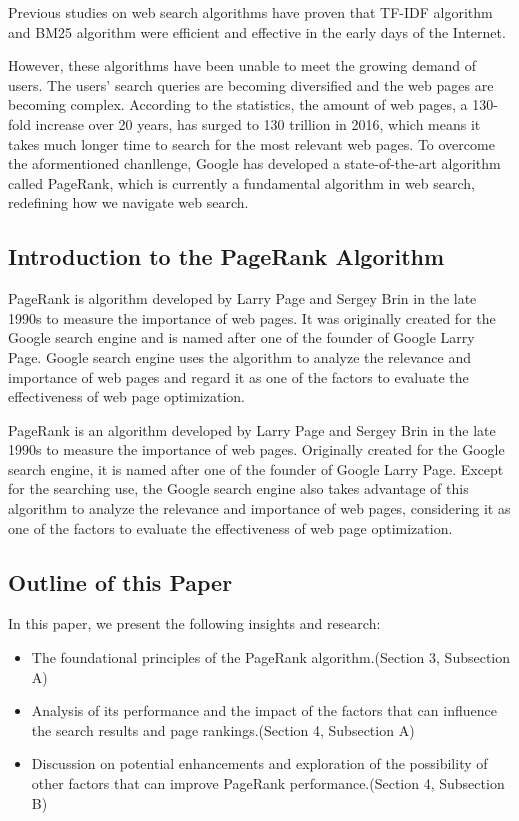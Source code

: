 \documentclass[lettersize,journal,12pt]{IEEEtran}
\begin{document}
Previous studies on web search algorithms have proven that TF-IDF algorithm and BM25 algorithm were efficient and effective in the early days of the Internet.

However, these algorithms have been unable to meet the growing demand of users.
The users' search queries are becoming diversified and the web pages are becoming complex.
According to the statistics, the amount of web pages, a 130-fold increase over 20 years, has surged to 130 trillion in 2016, which means it takes much longer time to search for the most relevant web pages.
To overcome the aformentioned chanllenge, Google has developed a state-of-the-art algorithm called PageRank, which is currently a fundamental algorithm in web search, redefining how we navigate web search.

\subsection{Introduction to the PageRank Algorithm} 
PageRank is algorithm developed by Larry Page and Sergey Brin in the late 1990s to measure the importance of web pages.
It was originally created for the Google search engine and is named after one of the founder of Google Larry Page.
Google search engine uses the algorithm to analyze the relevance and importance of web pages and regard it as one of the factors to evaluate the effectiveness of web page optimization.

PageRank is an algorithm developed by Larry Page and Sergey Brin in the late 1990s to measure the importance of web pages. 
Originally created for the Google search engine, it is named after one of the founder of Google Larry Page. Except for the searching use, the Google search engine also takes advantage of this algorithm to analyze the relevance and importance of web pages, considering it as one of the factors to evaluate the effectiveness of web page optimization. 

\subsection{Outline of this Paper}

In this paper, we present the following insights and research:
\begin{itemize}
	\item The foundational principles of the PageRank algorithm.(Section 3, Subsection A)
	\item Analysis of its performance and the impact of the factors that can influence the search results and page rankings.(Section 4, Subsection A)
	\item Discussion on potential enhancements and exploration of the possibility of other factors that can improve PageRank performance.(Section 4, Subsection B)
\end{itemize}
\end{document}
